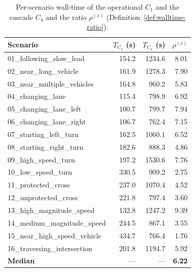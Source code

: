 \begin{table}[t]
    \centering
    \caption{Per-scenario wall-time of the operational $C_1$ and the cascade $C_4$ and the ratio $\rho^{(s)}$ (Definition~\ref{def:walltime-ratio}).}
    \label{tab:walltime}
    \footnotesize
\begin{tabular}{lrrr}
\toprule
Scenario & $T_{C_1}$ (s) & $T_{C_4}$ (s) & $\rho^{(s)}$ \\
\midrule
01\_following\_slow\_lead & 154.2 & 1234.6 & 8.01 \\
02\_near\_long\_vehicle & 161.9 & 1278.3 & 7.90 \\
03\_near\_multiple\_vehicles & 164.8 & 960.2 & 5.83 \\
04\_changing\_lane & 115.4 & 798.9 & 6.92 \\
05\_changing\_lane\_left & 100.7 & 799.7 & 7.94 \\
06\_changing\_lane\_right & 106.7 & 762.4 & 7.15 \\
07\_starting\_left\_turn & 162.5 & 1060.1 & 6.52 \\
08\_starting\_right\_turn & 182.6 & 888.3 & 4.86 \\
09\_high\_speed\_turn & 197.2 & 1530.6 & 7.76 \\
10\_low\_speed\_turn & 330.5 & 909.2 & 2.75 \\
11\_protected\_cross & 237.0 & 1070.4 & 4.52 \\
12\_unprotected\_cross & 221.8 & 797.4 & 3.60 \\
13\_high\_magnitude\_speed & 132.8 & 1247.2 & 9.39 \\
14\_medium\_magnitude\_speed & 244.5 & 867.1 & 3.55 \\
15\_near\_high\_speed\_vehicle & 434.7 & 766.4 & 1.76 \\
16\_traversing\_intersection & 201.8 & 1194.7 & 5.92 \\
\midrule
\textbf{Median} & --- & --- & \textbf{6.22} \\
\bottomrule
\end{tabular}
\end{table}
